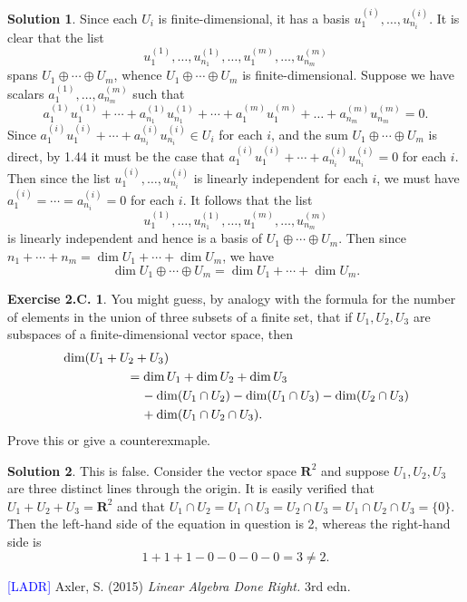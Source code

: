 \documentclass[12pt]{article}
\theoremstyle{definition}
\theoremstyle{exercise}
\newtheorem{exercise}{Exercise 2.C.}
\theoremstyle{solution}
\newtheorem*{solution}{Solution}
\newcommand{\R}{\mathbf{R}}
\begin{document}
\begin{solution}
    Since each \( U_i \) is finite-dimensional, it has a basis \( u^{(i)}_1, \ldots, u^{(i)}_{n_i} \). It is clear that the list
    \[
        u^{(1)}_1, \ldots, u^{(1)}_{n_1}, \ldots, u^{(m)}_1, \ldots, u^{(m)}_{n_m}
    \]
    spans \( U_1 \oplus \cdots \oplus U_m \), whence \( U_1 \oplus \cdots \oplus U_m \) is finite-dimensional. Suppose we have scalars \( a^{(1)}_1, \ldots, a^{(m)}_{n_m} \) such that
    \[
        a^{(1)}_1 u^{(1)}_1 + \cdots + a^{(1)}_{n_1} u^{(1)}_{n_1} + \cdots + a^{(m)}_1 u^{(m)}_1 + \ldots + a^{(m)}_{n_m} u^{(m)}_{n_m} = 0.
    \]
    Since \( a^{(i)}_1 u^{(i)}_1 + \cdots + a^{(i)}_{n_i} u^{(i)}_{n_i} \in U_i \) for each \( i \), and the sum \( U_1 \oplus \cdots \oplus U_m \) is direct, by 1.44 it must be the case that \( a^{(i)}_1 u^{(i)}_1 + \cdots + a^{(i)}_{n_i} u^{(i)}_{n_i} = 0 \) for each \( i \). Then since the list \( u^{(i)}_1, \ldots, u^{(i)}_{n_i} \) is linearly independent for each \( i \), we must have \( a^{(i)}_1 = \cdots = a^{(i)}_{n_i} = 0 \) for each \( i \). It follows that the list
    \[
        u^{(1)}_1, \ldots, u^{(1)}_{n_1}, \ldots, u^{(m)}_1, \ldots, u^{(m)}_{n_m}
    \]
    is linearly independent and hence is a basis of \( U_1 \oplus \cdots \oplus U_m \). Then since \( n_1 + \cdots + n_m = \dim U_1 + \cdots + \dim U_m \), we have
    \[
        \dim U_1 \oplus \cdots \oplus U_m = \dim U_1 + \cdots + \dim U_m.
    \]
\end{solution}

\begin{exercise}
\label{ex:17}
    You might guess, by analogy with the formula for the number of elements in the union of three subsets of a finite set, that if \( U_1, U_2, U_3 \) are subspaces of a finite-dimensional vector space, then
    \begin{align*}
        & \dim(U_1 + U_2 + U_3) \\
        & \hspace{18mm} = \dim U_1 + \dim U_2 + \dim U_3 \\
        & \hspace{22mm} - \dim(U_1 \cap U_2) - \dim(U_1 \cap U_3) - \dim(U_2 \cap U_3) \\
        & \hspace{22mm} + \dim(U_1 \cap U_2 \cap U_3).
    \end{align*}
    Prove this or give a counterexmaple.
\end{exercise}

\begin{solution}
    This is false. Consider the vector space \( \R^2 \) and suppose \( U_1, U_2, U_3 \) are three distinct lines through the origin. It is easily verified that \( U_1 + U_2 + U_3 = \R^2 \) and that \( U_1 \cap U_2 = U_1 \cap U_3 = U_2 \cap U_3 = U_1 \cap U_2 \cap U_3 = \{ 0 \} \). Then the left-hand side of the equation in question is 2, whereas the right-hand side is
    \[
        1 + 1 + 1 - 0 - 0 - 0 - 0 = 3 \neq 2.
    \]
\end{solution}

\noindent \hrulefill

\noindent \hypertarget{ladr}{\textcolor{blue}{[LADR]} Axler, S. (2015) \textit{Linear Algebra Done Right.} 3rd edn.}
\end{document}
